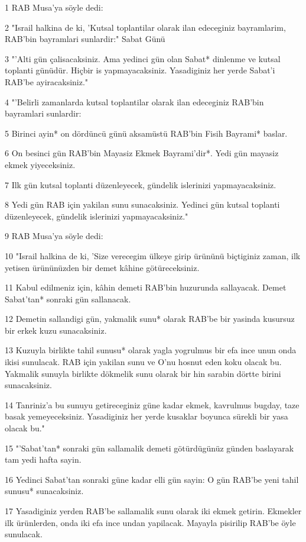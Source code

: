 \par 1 RAB Musa'ya söyle dedi:
\par 2 "Israil halkina de ki, 'Kutsal toplantilar olarak ilan edeceginiz bayramlarim, RAB'bin bayramlari sunlardir:" Sabat Günü
\par 3 "'Alti gün çalisacaksiniz. Ama yedinci gün olan Sabat* dinlenme ve kutsal toplanti günüdür. Hiçbir is yapmayacaksiniz. Yasadiginiz her yerde Sabat'i RAB'be ayiracaksiniz."
\par 4 "'Belirli zamanlarda kutsal toplantilar olarak ilan edeceginiz RAB'bin bayramlari sunlardir:
\par 5 Birinci ayin* on dördüncü günü aksamüstü RAB'bin Fisih Bayrami* baslar.
\par 6 On besinci gün RAB'bin Mayasiz Ekmek Bayrami'dir*. Yedi gün mayasiz ekmek yiyeceksiniz.
\par 7 Ilk gün kutsal toplanti düzenleyecek, gündelik islerinizi yapmayacaksiniz.
\par 8 Yedi gün RAB için yakilan sunu sunacaksiniz. Yedinci gün kutsal toplanti düzenleyecek, gündelik islerinizi yapmayacaksiniz."
\par 9 RAB Musa'ya söyle dedi:
\par 10 "Israil halkina de ki, 'Size verecegim ülkeye girip ürününü biçtiginiz zaman, ilk yetisen ürününüzden bir demet kâhine götüreceksiniz.
\par 11 Kabul edilmeniz için, kâhin demeti RAB'bin huzurunda sallayacak. Demet Sabat'tan* sonraki gün sallanacak.
\par 12 Demetin sallandigi gün, yakmalik sunu* olarak RAB'be bir yasinda kusursuz bir erkek kuzu sunacaksiniz.
\par 13 Kuzuyla birlikte tahil sunusu* olarak yagla yogrulmus bir efa ince unun onda ikisi sunulacak. RAB için yakilan sunu ve O'nu hosnut eden koku olacak bu. Yakmalik sunuyla birlikte dökmelik sunu olarak bir hin sarabin dörtte birini sunacaksiniz.
\par 14 Tanriniz'a bu sunuyu getireceginiz güne kadar ekmek, kavrulmus bugday, taze basak yemeyeceksiniz. Yasadiginiz her yerde kusaklar boyunca sürekli bir yasa olacak bu."
\par 15 "'Sabat'tan* sonraki gün sallamalik demeti götürdügünüz günden baslayarak tam yedi hafta sayin.
\par 16 Yedinci Sabat'tan sonraki güne kadar elli gün sayin: O gün RAB'be yeni tahil sunusu* sunacaksiniz.
\par 17 Yasadiginiz yerden RAB'be sallamalik sunu olarak iki ekmek getirin. Ekmekler ilk ürünlerden, onda iki efa ince undan yapilacak. Mayayla pisirilip RAB'be öyle sunulacak.
